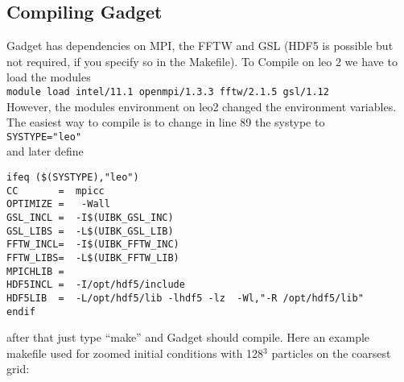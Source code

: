 \documentclass[a4paper,english,10.5pt]{scrartcl}
\begin{document}
\subsection{Compiling Gadget}
Gadget has dependencies on MPI, the FFTW and GSL (HDF5 is possible but not required, if you specify so in the Makefile). To Compile on leo 2 we have to load the modules\\
\texttt{module load intel/11.1 openmpi/1.3.3 fftw/2.1.5   gsl/1.12}\\
However, the modules environment on leo2 changed the environment variables. The easiest way to compile is to change in line 89 the systype to\\
\texttt{SYSTYPE="leo"}\\
and later define
\begin{verbatim}
ifeq ($(SYSTYPE),"leo")
CC       =  mpicc   
OPTIMIZE =   -Wall 
GSL_INCL =  -I$(UIBK_GSL_INC)
GSL_LIBS =  -L$(UIBK_GSL_LIB) 
FFTW_INCL=  -I$(UIBK_FFTW_INC)
FFTW_LIBS=  -L$(UIBK_FFTW_LIB)
MPICHLIB =
HDF5INCL =  -I/opt/hdf5/include
HDF5LIB  =  -L/opt/hdf5/lib -lhdf5 -lz  -Wl,"-R /opt/hdf5/lib"
endif
\end{verbatim}
after that just type ``make'' and Gadget should compile. Here an example makefile used for zoomed initial conditions with 128$^3$ particles on the coarsest grid:
\end{document}
